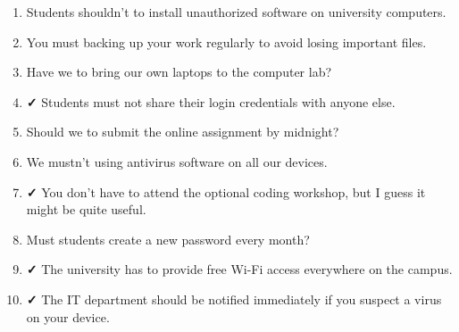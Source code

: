 \documentclass[12pt]{article}
\begin{document}
\begin{enumerate}[label=\arabic*.]
    \item Students shouldn't to install unauthorized software on university computers.
    
    \item You must backing up your work regularly to avoid losing important files.
    
    \item Have we to bring our own laptops to the computer lab?
    
    \item \textbf{✓} Students must not share their login credentials with anyone else.
    
    \item Should we to submit the online assignment by midnight?
    
    \item We mustn’t using antivirus software on all our devices.
    
    \item \textbf{✓} You don't have to attend the optional coding workshop, but I guess it might be quite useful.
    
    \item Must students create a new password every month?
    
    \item \textbf{✓} The university has to provide free Wi-Fi access everywhere on the campus.
    
    \item \textbf{✓} The IT department should be notified immediately if you suspect a virus on your device.
\end{enumerate}
\end{document}
